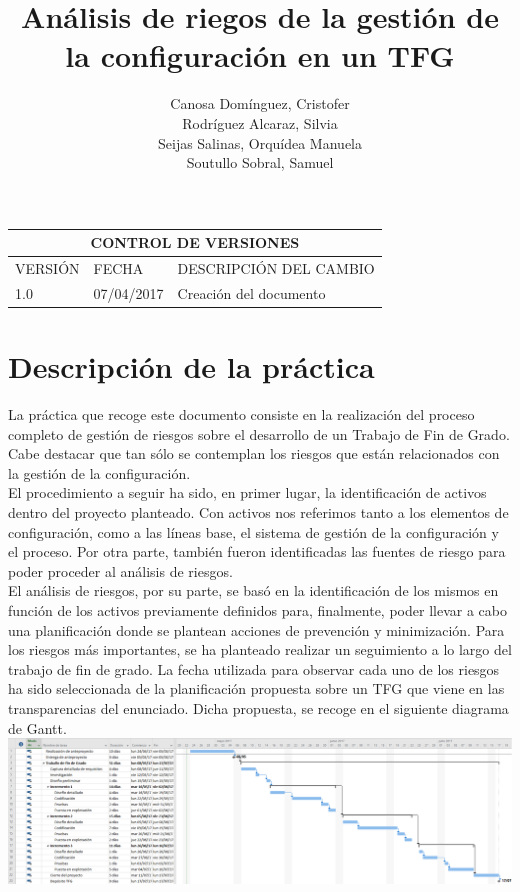 \documentclass[10pt,a4paper]{article}
\author{Canosa Domínguez, Cristofer \\ Rodríguez Alcaraz, Silvia \\ Seijas Salinas, Orquídea Manuela \\ Soutullo Sobral, Samuel}
\title{Análisis de riegos de la gestión de la configuración en un TFG}
\begin{document}
	\maketitle %
	\newpage
	\begin{table}[htb]
    	\centering
    	\begin{tabular}{|l|l|l|}
   			\hline
    		\multicolumn{3}{|c|}{CONTROL DE VERSIONES} \\ \hline
    		VERSIÓN & FECHA & DESCRIPCIÓN DEL CAMBIO\\
    		\hline \hline
    		1.0 & 07/04/2017 & Creación del documento \\ \hline
    	\end{tabular}   
    \end{table}
	\newpage
	\tableofcontents
	\newpage
	\pagestyle{fancy}
	\section{Descripción de la práctica}
	La práctica que recoge este documento consiste en la realización del proceso completo de gestión de riesgos sobre el desarrollo de un Trabajo de Fin de Grado. Cabe destacar que tan sólo se contemplan los riesgos que están relacionados con la gestión de la configuración.\\
	
	El procedimiento a seguir ha sido, en primer lugar, la identificación de activos dentro del proyecto planteado. Con activos nos referimos tanto a los elementos de configuración, como a las líneas base, el sistema de gestión de la configuración y el proceso. Por otra parte, también fueron identificadas las fuentes de riesgo para poder proceder al análisis de riesgos.\\
	
	El análisis de riesgos, por su parte, se basó en la identificación de los mismos en función de los activos previamente definidos para, finalmente, poder llevar a cabo una planificación donde se plantean acciones de prevención y  minimización. Para los riesgos más importantes, se ha planteado realizar un seguimiento a lo largo del trabajo de fin de grado. La fecha utilizada para observar cada uno de los riesgos ha sido seleccionada de la planificación propuesta sobre un TFG que viene en las transparencias del enunciado. Dicha propuesta, se recoge en el siguiente diagrama de Gantt. \\
	
	\includegraphics[scale=0.3]{imagenes/tfg.png}
		
\end{document}
